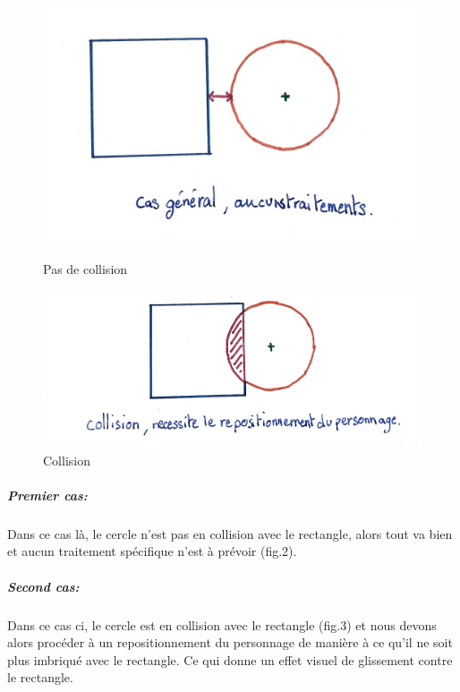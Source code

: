\documentclass[11pt]{article}
\begin{document}
\begin{figure}
	\begin{minipage}{0.48\textwidth}
		\includegraphics[width=\linewidth]{image/fig2.jpg}
		\caption{Pas de collision}
		\label{fig:pas_de_collision}
	\end{minipage}
	\begin{minipage}{0.48\textwidth}
		\includegraphics[width=\linewidth]{image/fig3.jpg}
		\caption{Collision}
		\label{fig:collision}
	\end{minipage}
\end{figure}

\subparagraph{Premier cas:} 


Dans ce cas là, le cercle n'est pas en collision avec le rectangle, alors 
tout va bien et aucun traitement spécifique n'est à prévoir (fig.2). 

\subparagraph{Second cas:} 



Dans ce cas ci, le cercle est en collision avec le rectangle (fig.3) et nous 
devons alors procéder à un repositionnement du personnage de manière à ce 
qu'il ne soit plus imbriqué avec le rectangle. Ce qui donne un effet visuel 
de glissement contre le rectangle.
\end{document}
